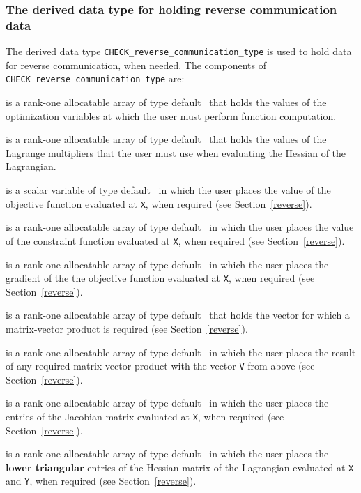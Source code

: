 \documentclass{galahad}
\newcommand{\packagename}{CHECK}
\begin{document}

\subsubsection{The derived data type for holding reverse communication data}\label{typerc}
The derived data type {\tt \packagename\_reverse\_communication\_type}
is used to hold data for reverse communication, when needed. The components of 
{\tt \packagename\_reverse\_communication\_type} are:

\begin{description}

 is a rank-one allocatable array of type default \realdp\ that
holds the values of the optimization variables at which the user must
perform function computation.

 is a rank-one allocatable array of type default \realdp\ that
holds the values of the Lagrange multipliers that the user must use
when evaluating the Hessian of the Lagrangian.

 is a scalar variable of type default \realdp\ in which the
user places the value of the objective function evaluated at {\tt X},
when required (see Section~\ref{reverse}).

 is a rank-one allocatable array of type default \realdp\ in
which the user places the value of the constraint function evaluated
at {\tt X}, when required (see Section~\ref{reverse}).

 is a rank-one allocatable array of type default \realdp\ in
which the user places the gradient of the the objective function
evaluated at {\tt X}, when required (see Section~\ref{reverse}).

 is a rank-one allocatable array of type default \realdp\ that
holds the vector for which a matrix-vector product is required (see
Section~\ref{reverse}).

 is a rank-one allocatable array of type default \realdp\ in
which the user places the result of any required matrix-vector product
with the vector {\tt V} from above (see Section~\ref{reverse}). 

 is a rank-one allocatable array of type default \realdp\ in
which the user places the entries of the Jacobian matrix evaluated at
{\tt X}, when required (see Section~\ref{reverse}). 

 is a rank-one allocatable array of type default \realdp\ in
which the user places the {\bf lower triangular} entries of the Hessian matrix of the
Lagrangian evaluated at
{\tt X} and {\tt Y}, when required (see Section~\ref{reverse}). 

\end{description}
\end{document}
